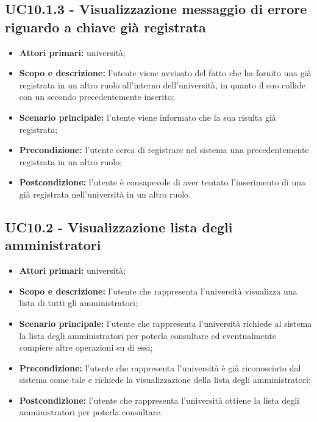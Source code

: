 \documentclass[AnalisiDeiRequisiti.tex]{subfiles}
\begin{document}
\subsection{UC10.1.3 - Visualizzazione messaggio di errore riguardo a chiave già registrata}
\begin{itemize}
	\item \textbf{Attori primari:} università;
	\item \textbf{Scopo e descrizione:} l'utente viene avvisato del fatto che ha fornito una  già registrata in un altro ruolo all'interno dell'università, in quanto il suo  collide con un secondo precedentemente inserito;
	\item \textbf{Scenario principale:} l'utente viene informato che la sua  risulta già registrata;
	\item \textbf{Precondizione:} l'utente cerca di registrare nel sistema una  precedentemente registrata in un altro ruolo;
	\item \textbf{Postcondizione:} l'utente è consapevole di aver tentato l'inserimento di una  già registrata nell'università in un altro ruolo.
\end{itemize}


\subsection{UC10.2 - Visualizzazione lista degli amministratori}
\begin{itemize}
	\item \textbf{Attori primari:} università;
	\item \textbf{Scopo e descrizione:} l'utente che rappresenta l'università visualizza una lista di tutti gli amministratori;
	\item \textbf{Scenario principale:} l'utente che rappresenta l'università richiede al sistema la lista degli amministratori per poterla consultare ed eventualmente compiere altre operazioni su di essi;
	\item \textbf{Precondizione:} l'utente che rappresenta l'università è già riconosciuto dal sistema come tale e richiede la visualizzazione della lista degli amministratori;
	\item \textbf{Postcondizione:} l'utente che rappresenta l'università ottiene la lista degli amministratori per poterla consultare.
\end{itemize}
\end{document}
